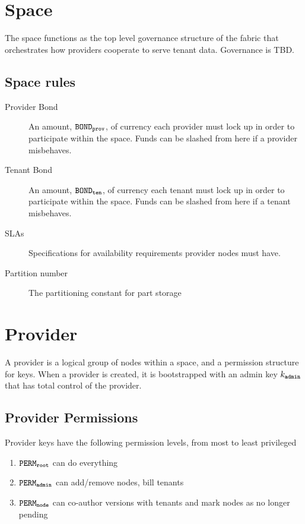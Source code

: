 \documentclass{article}
\begin{document}
\section{Space}

The space functions as the top level governance structure of the fabric that orchestrates how providers cooperate to serve tenant data. 
Governance is TBD.

\subsection{Space rules}
\begin{description}
  \item[Provider Bond] An amount, $\mathtt{BOND_{prov}}$, of currency each provider must lock up in order to participate within the space. Funds can be slashed from here if a provider misbehaves.
  \item[Tenant Bond] An amount, $\mathtt{BOND_{ten}}$, of currency each tenant must lock up in order to participate within the space. Funds can be slashed from here if a tenant misbehaves.
  \item[SLAs] Specifications for availability requirements provider nodes must have.
  \item[Partition number] The partitioning constant for part storage
\end{description}

\section{Provider}

A provider is a logical group of nodes within a space, and a permission structure for keys.
When a provider is created, it is bootstrapped with an admin key $k_\mathtt{admin}$ that has total control of the provider.

\subsection{Provider Permissions}
Provider keys have the following permission levels, from most to least privileged

\begin{enumerate}
  \item $\mathtt{PERM_{root}}$ can do everything
  \item $\mathtt{PERM_{admin}}$ can add/remove nodes, bill tenants
  \item $\mathtt{PERM_{node}}$ can co-author versions with tenants and mark nodes as no longer pending
\end{enumerate}
\end{document}
